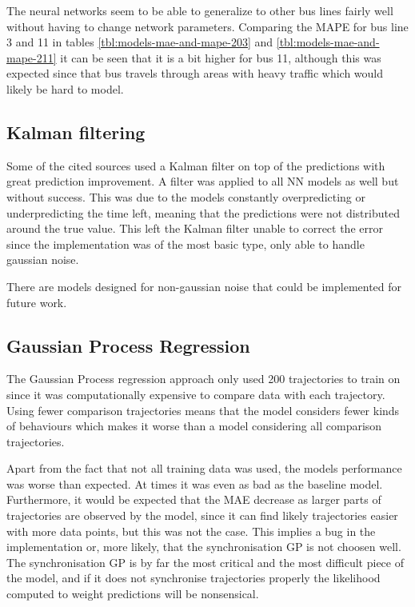 The neural networks seem to be able to generalize to other bus lines fairly well without having to change network parameters. Comparing the MAPE for bus line 3 and 11 in tables \ref{tbl:models-mae-and-mape-203} and \ref{tbl:models-mae-and-mape-211} it can be seen that it is a bit higher for bus 11, although this was expected since that bus travels through areas with heavy traffic which would likely be hard to model.

\subsection{Kalman filtering}
Some of the cited sources used a Kalman filter on top of the predictions with great prediction improvement. A filter was applied to all NN models as well but without success. This was due to the models constantly overpredicting or underpredicting the time left, meaning that the predictions were not distributed around the true value. This left the Kalman filter unable to correct the error since the implementation was of the most basic type, only able to handle gaussian noise. 

There are models designed for non-gaussian noise that could be implemented for future work.

\subsection{Gaussian Process Regression}
The Gaussian Process regression approach only used 200 trajectories to train on since it was computationally expensive to compare data with each trajectory. Using fewer comparison trajectories means that the model considers fewer kinds of behaviours which makes it worse than a model considering all comparison trajectories.

Apart from the fact that not all training data was used, the models performance was worse than expected. At times it was even as bad as the baseline model. Furthermore, it would be expected that the MAE decrease as larger parts of trajectories are observed by the model, since it can find likely trajectories easier with more data points, but this was not the case. This implies a bug in the implementation or, more likely, that the synchronisation GP is not choosen well. The synchronisation GP is by far the most critical and the most difficult piece of the model, and if it does not synchronise trajectories properly the likelihood computed to weight predictions will be nonsensical.

